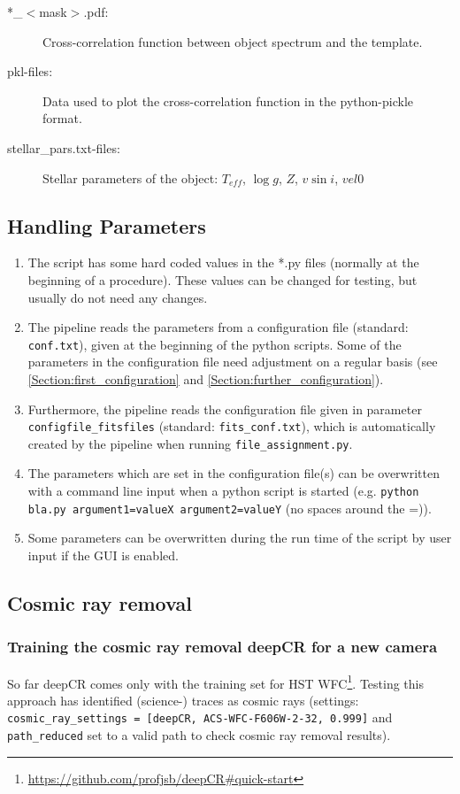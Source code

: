 \documentclass[10pt,a4paper]{article}
\begin{document}
\begin{description}
  \item[*\_$<$mask$>$.pdf:] Cross-correlation function between object spectrum and the template.
  \item[pkl-files:] Data used to plot the cross-correlation function in the python-pickle format.
  \item[stellar\_pars.txt-files:] Stellar parameters of the object: $T_{eff}$, $\log g$, $Z$, $v\sin i$, $vel0$
\end{description}


\subsection{Handling Parameters}

\begin{enumerate}
  \item The script has some hard coded values in the *.py files (normally at the beginning of a procedure). These values can be changed for testing, but usually do not need any changes.
  \item The pipeline reads the parameters from a configuration file (standard: \verb|conf.txt|), given at the beginning of the python scripts. Some of the parameters in the configuration file need adjustment on a regular basis (see \ref{Section:first_configuration} and \ref{Section:further_configuration}).
  \item Furthermore, the pipeline reads the configuration file given in parameter \verb|configfile_fitsfiles| (standard: \verb|fits_conf.txt|), which is automatically created by the pipeline when running \verb|file_assignment.py|.
  \item The parameters which are set in the configuration file(s) can be overwritten with a command line input when a python script is started (e.g. \verb|python bla.py argument1=valueX argument2=valueY| (no spaces around the =)).
  \item Some parameters can be overwritten during the run time of the script by user input if the GUI is enabled.
\end{enumerate}


\subsection{Cosmic ray removal}
\subsubsection{Training the cosmic ray removal deepCR for a new camera}
\label{Section:train_deepCR}
So far deepCR comes only with the training set for HST WFC\footnote{\url{https://github.com/profjsb/deepCR\#quick-start}}. Testing this approach has identified (science-) traces as cosmic rays (settings: \verb|cosmic_ray_settings = [deepCR, ACS-WFC-F606W-2-32, 0.999]| and \verb|path_reduced| set to a valid path to check cosmic ray removal results).
\end{document}
